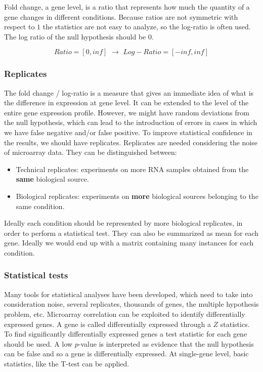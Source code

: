 	Fold change, a gene level, is a ratio that represents how much the quantity of a gene changes in different conditions.
	Because ratios are not symmetric with respect to $1$ the statistics are not easy to analyze, so the log-ratio is often used.
	The log ratio of the null hypothesis should be $0$.
	
	$$Ratio = [0, inf] \,\, \rightarrow \,\, Log-Ratio = [-inf, inf]$$

		\subsubsection{Replicates}
		The fold change / log-ratio is a measure that gives an immediate idea of what is the difference in expression at gene level. 
		It can be extended to the level of the entire gene expression profile.
		However, we might have random deviations from the null hypothesis, which can lead to the introduction of errors in cases in which we have false negative and/or false positive. 
		To improve statistical confidence in the results, we should have replicates.
		Replicates are needed considering the noise of microarray data.
		They can be distinguished between:

		\begin{multicols}{2}
			\begin{itemize}
				\item Technical replicates: experiments on more RNA samples obtained from the \textbf{same} biological source.
				\item Biological replicates: experiments on \textbf{more} biological sources belonging to the same condition.
			\end{itemize}
		\end{multicols}

		Ideally each condition should be represented by more biological replicates, in order to perform a statistical test.
		They can also be summarized as mean for each gene.
		Ideally we would end up with a matrix containing many instances for each condition. 

		\subsubsection{Statistical tests}
		Many tools for statistical analyses have been developed, which need to take into consideration noise, several replicates, thousands of genes, the multiple hypothesis problem, etc.
		Microarray correlation can be exploited to identify differentially expressed genes.
		A gene is called differentially expressed through a $Z$ statistics.
		To find significantly differentially expressed genes a test statistic for each gene should be used.
		A low $p$-value is interpreted as evidence that the null hypothesis can be false and so a gene is differentially expressed.
		At single-gene level, basic statistics, like the T-test can be applied. 

